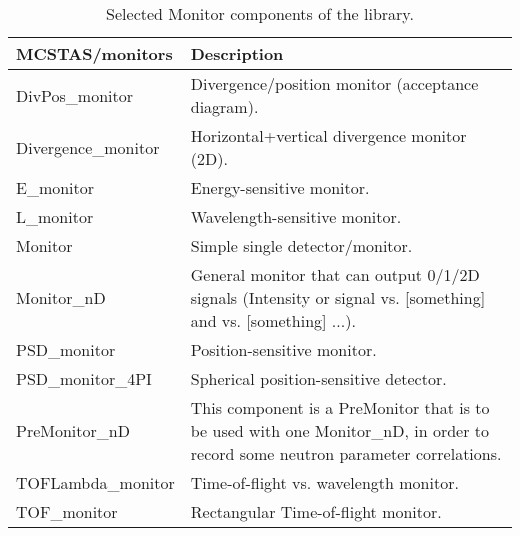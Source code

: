 \begin{table}
  \begin{center}
    {\let\my=\\
    \begin{tabular}{|p{}|p{}|}
      \hline
       {\bf MCSTAS/monitors} & Description \\
       \hline
DivPos\_monitor  &    Divergence/position monitor (acceptance diagram). \\
Divergence\_monitor &  Horizontal+vertical
                    divergence monitor (2D). \\
E\_monitor       &    Energy-sensitive monitor. \\
L\_monitor        &  Wavelength-sensitive monitor. \\
Monitor          &   Simple single detector/monitor. \\
Monitor\_nD      &   General monitor that can output
                    0/1/2D signals (Intensity or signal vs. [something]
                    and vs. [something] ...). \\
PSD\_monitor     &    Position-sensitive monitor. \\
PSD\_monitor\_4PI  &   Spherical position-sensitive detector. \\
PreMonitor\_nD    &   This component is a PreMonitor that is to be
                    used with one Monitor\_nD,
                    in order to record some neutron parameter correlations. \\
TOFLambda\_monitor &  Time-of-flight vs. wavelength monitor. \\
TOF\_monitor     &    Rectangular Time-of-flight monitor. \\
      \hline
    \end{tabular}
    \caption{Selected Monitor components of the \MCS library.}
    \label{t:comp-monitors}
    }
  \end{center}
\end{table}

